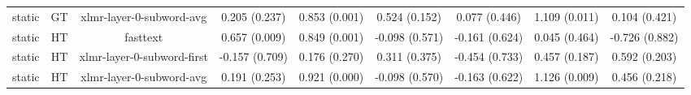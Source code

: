 \begin{sidewaystable}[htb]
\begin{tabular}{@{}ccccccccc@{}}
        static & GT & xlmr-layer-0-subword-avg & 0.205 (0.237) & 0.853 (0.001) & 0.524 (0.152) & 0.077 (0.446) & 1.109 (0.011) & 0.104 (0.421) \\
        static & HT & fasttext & 0.657 (0.009) & 0.849 (0.001) & -0.098 (0.571) & -0.161 (0.624) & 0.045 (0.464) & -0.726 (0.882) \\
        static & HT & xlmr-layer-0-subword-first & -0.157 (0.709) & 0.176 (0.270) & 0.311 (0.375) & -0.454 (0.733) & 0.457 (0.187) & 0.592 (0.203) \\
        static & HT & xlmr-layer-0-subword-avg & 0.191 (0.253) & 0.921 (0.000) & -0.098 (0.570) & -0.163 (0.622) & 1.126 (0.009) & 0.456 (0.218) \\
        \bottomrule
    \end{tabular}
\end{sidewaystable}